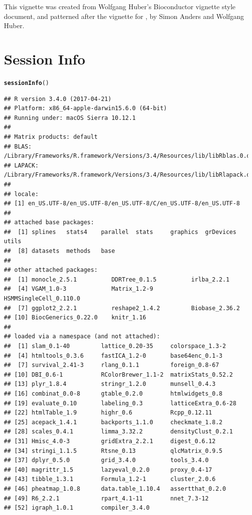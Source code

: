 \documentclass[10pt,oneside]{article}\usepackage[]{graphicx}\usepackage[]{color}
\makeatletter
\newcommand{\hlstd}[1]{\textcolor[rgb]{0.345,0.345,0.345}{#1}}%
\newcommand{\hlkwd}[1]{\textcolor[rgb]{0.737,0.353,0.396}{\textbf{#1}}}%
\newenvironment{kframe}{%
 \def\at@end@of@kframe{}%
 \ifinner\ifhmode%
  \def\at@end@of@kframe{\end{minipage}}%
  \begin{minipage}{\columnwidth}%
 \fi\fi%
 \def\FrameCommand##1{\hskip\@totalleftmargin \hskip-\fboxsep
 \colorbox{shadecolor}{##1}\hskip-\fboxsep
     \hskip-\linewidth \hskip-\@totalleftmargin \hskip\columnwidth}%
 \MakeFramed {\advance\hsize-\width
   \@totalleftmargin\z@ \linewidth\hsize
   \@setminipage}}%
 {\par\unskip\endMakeFramed%
 \at@end@of@kframe}
\newenvironment{knitrout}{}{} %
\makeatother
\begin{document}
 This vignette was created from Wolfgang Huber's Bioconductor vignette style document, and patterned after the vignette for , by Simon Anders and Wolfgang Huber.

\section{Session Info}
\begin{knitrout}
\color{fgcolor}\begin{kframe}
\begin{alltt}
\hlkwd{sessionInfo}\hlstd{()}
\end{alltt}
\begin{verbatim}
## R version 3.4.0 (2017-04-21)
## Platform: x86_64-apple-darwin15.6.0 (64-bit)
## Running under: macOS Sierra 10.12.1
## 
## Matrix products: default
## BLAS: /Library/Frameworks/R.framework/Versions/3.4/Resources/lib/libRblas.0.dylib
## LAPACK: /Library/Frameworks/R.framework/Versions/3.4/Resources/lib/libRlapack.dylib
## 
## locale:
## [1] en_US.UTF-8/en_US.UTF-8/en_US.UTF-8/C/en_US.UTF-8/en_US.UTF-8
## 
## attached base packages:
##  [1] splines   stats4    parallel  stats     graphics  grDevices utils    
##  [8] datasets  methods   base     
## 
## other attached packages:
##  [1] monocle_2.5.1          DDRTree_0.1.5          irlba_2.2.1           
##  [4] VGAM_1.0-3             Matrix_1.2-9           HSMMSingleCell_0.110.0
##  [7] ggplot2_2.2.1          reshape2_1.4.2         Biobase_2.36.2        
## [10] BiocGenerics_0.22.0    knitr_1.16            
## 
## loaded via a namespace (and not attached):
##  [1] slam_0.1-40         lattice_0.20-35     colorspace_1.3-2   
##  [4] htmltools_0.3.6     fastICA_1.2-0       base64enc_0.1-3    
##  [7] survival_2.41-3     rlang_0.1.1         foreign_0.8-67     
## [10] DBI_0.6-1           RColorBrewer_1.1-2  matrixStats_0.52.2 
## [13] plyr_1.8.4          stringr_1.2.0       munsell_0.4.3      
## [16] combinat_0.0-8      gtable_0.2.0        htmlwidgets_0.8    
## [19] evaluate_0.10       labeling_0.3        latticeExtra_0.6-28
## [22] htmlTable_1.9       highr_0.6           Rcpp_0.12.11       
## [25] acepack_1.4.1       backports_1.1.0     checkmate_1.8.2    
## [28] scales_0.4.1        limma_3.32.2        densityClust_0.2.1 
## [31] Hmisc_4.0-3         gridExtra_2.2.1     digest_0.6.12      
## [34] stringi_1.1.5       Rtsne_0.13          qlcMatrix_0.9.5    
## [37] dplyr_0.5.0         grid_3.4.0          tools_3.4.0        
## [40] magrittr_1.5        lazyeval_0.2.0      proxy_0.4-17       
## [43] tibble_1.3.1        Formula_1.2-1       cluster_2.0.6      
## [46] pheatmap_1.0.8      data.table_1.10.4   assertthat_0.2.0   
## [49] R6_2.2.1            rpart_4.1-11        nnet_7.3-12        
## [52] igraph_1.0.1        compiler_3.4.0
\end{verbatim}
\end{kframe}
\end{knitrout}



\end{document}

